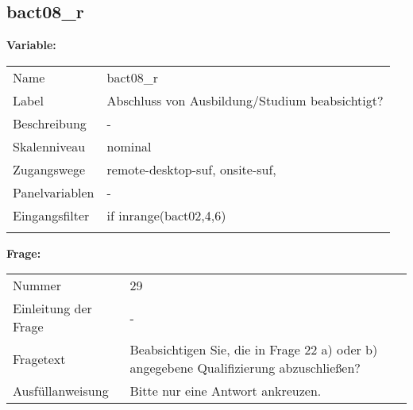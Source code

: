 	
	
	\subsection{bact08\_r}
	\label{subSection:bact08_r}

	\noindent\textbf{Variable:}\\
		\begin{tabular}{lL{11.3cm}}
			\label{tableVariable:bact08_r}
			Name & bact08\_r \\
			Label & Abschluss von Ausbildung/Studium beabsichtigt? \\
			Beschreibung & - \\
			Skalenniveau & nominal \\
			Zugangswege &
				remote-desktop-suf,
				onsite-suf,
 \\
			Panelvariablen & -
			 \\
			Eingangsfilter & if inrange(bact02,4,6) \\
 \\
		\end{tabular}

		\vspace*{1 cm}
		\noindent\textbf{Frage:}\\
		\begin{tabular}{lL{11.3cm}}
			\label{tableQuestion:bact08_r}
			Nummer & 29 \\
			Einleitung der Frage & - \\
			Fragetext & Beabsichtigen Sie, die in Frage 22 a) oder b) angegebene Qualifizierung abzuschließen? \\
			Ausfüllanweisung & Bitte nur eine Antwort ankreuzen. \\
		\end{tabular}





